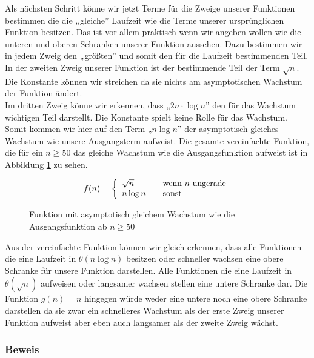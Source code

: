\documentclass[a4paper, 12pt]{article}
\begin{document}
Als nächsten Schritt könne wir jetzt Terme für die Zweige unserer Funktionen bestimmen die die „gleiche” Laufzeit wie die Terme unserer ursprünglichen Funktion besitzen. Das ist vor allem praktisch wenn wir \break angeben wollen wie die unteren und oberen Schranken unserer Funktion aussehen. Dazu bestimmen wir in jedem Zweig den „größten” und somit den für die Laufzeit bestimmenden Teil.\\

In der zweiten Zweig unserer Funktion ist der bestimmende Teil der Term $\sqrt n$. Die Konstante können wir streichen da sie nichts am asymptotischen Wachstum der Funktion ändert.\\

Im dritten Zweig könne wir erkennen, dass „$2 n ⋅ \log n$” den für das Wachstum wichtigen Teil darstellt. Die Konstante spielt keine Rolle für das Wachstum. Somit kommen wir hier auf den Term „$n \log n$” der asymptotisch gleiches Wachstum wie unsere Ausgangsterm aufweist. Die gesamte vereinfachte Funktion, die für ein $n≥ 50$ das gleiche Wachstum wie die Ausgangsfunktion aufweist ist in Abbildung \ref{Figure:Vereinfachte_Funktion_Gleiches_Wachstum} zu sehen.

\begin{figure}[H]
	\caption{Funktion mit asymptotisch gleichem Wachstum wie die 
	Ausgangsfunktion ab $n≥50$}
	\label{Figure:Vereinfachte_Funktion_Gleiches_Wachstum}
\[
	\label{function:Laufzeit_Vereinfacht}
	f(n) = \left\{ 
	\begin{array}{l l}		
		\sqrt n & \quad \text{wenn $n$ ungerade}\\
		
		n \log n & \quad \text{sonst}
	\end{array} \right.
\]
\end{figure}

Aus der vereinfachte Funktion können wir gleich erkennen, dass alle Funktionen die eine Laufzeit in $θ\left(n \log n\right)$ besitzen oder schneller wachsen eine obere Schranke für unsere Funktion darstellen. Alle Funktionen die eine Laufzeit in $θ\left( \sqrt n\right)$ aufweisen oder langsamer wachsen stellen eine untere Schranke dar. Die Funktion $g\left(n\right)=n$ hingegen würde weder eine untere noch eine obere Schranke darstellen da sie zwar ein schnelleres Wachstum als der erste Zweig unserer Funktion aufweist aber eben auch langsamer als der zweite Zweig wächst.

\subsubsection{Beweis}
\end{document}
